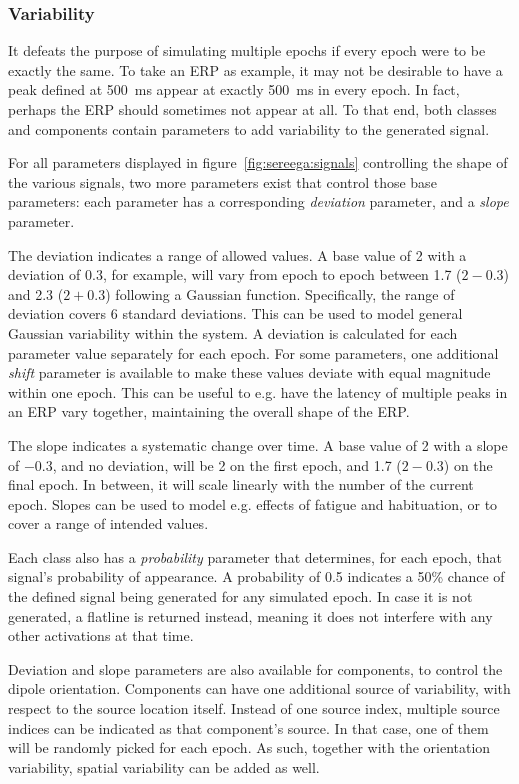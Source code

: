 \subsubsection{Variability}

It defeats the purpose of simulating multiple epochs if every epoch were to be exactly the same. To take an ERP as example, it may not be desirable to have a peak defined at 500~ms appear at exactly 500~ms in every epoch. In fact, perhaps the ERP should sometimes not appear at all. To that end, both classes and components contain parameters to add variability to the generated signal.

For all parameters displayed in figure~\ref{fig:sereega:signals} controlling the shape of the various signals, two more parameters exist that control those base parameters: each parameter has a corresponding \emph{deviation} parameter, and a \emph{slope} parameter.

The deviation indicates a range of allowed values. A base value of 2 with a deviation of 0.3, for example, will vary from epoch to epoch between 1.7 ($2-0.3$) and 2.3 ($2+0.3$) following a Gaussian function. Specifically, the range of deviation covers 6 standard deviations. This can be used to model general Gaussian variability within the system. A deviation is calculated for each parameter value separately for each epoch. For some parameters, one additional \emph{shift} parameter is available to make these values deviate with equal magnitude within one epoch. This can be useful to e.g. have the latency of multiple peaks in an ERP vary together, maintaining the overall shape of the ERP.

The slope indicates a systematic change over time. A base value of 2 with a slope of $-0.3$, and no deviation, will be 2 on the first epoch, and 1.7 ($2-0.3$) on the final epoch. In between, it will scale linearly with the number of the current epoch. Slopes can be used to model e.g. effects of fatigue and habituation, or to cover a range of intended values.

Each class also has a \emph{probability} parameter that determines, for each epoch, that signal's probability of appearance. A probability of 0.5 indicates a 50\% chance of the defined signal being generated for any simulated epoch. In case it is not generated, a flatline is returned instead, meaning it does not interfere with any other activations at that time.

Deviation and slope parameters are also available for components, to control the dipole orientation. Components can have one additional source of variability, with respect to the source location itself. Instead of one source index, multiple source indices can be indicated as that component's source. In that case, one of them will be randomly picked for each epoch. As such, together with the orientation variability, spatial variability can be added as well.


